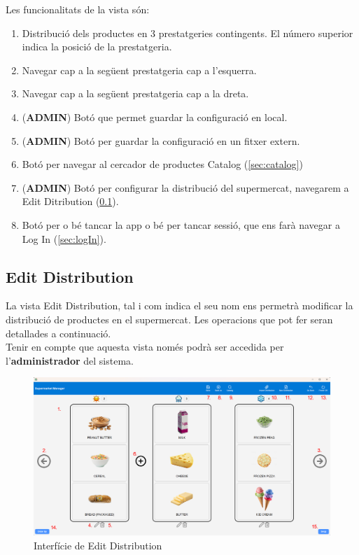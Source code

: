 \documentclass[a4paper,12pt]{article}
\begin{document}
	\noindent Les funcionalitats de la vista són:
	
	\begin{enumerate}[itemsep=0pt, topsep=0pt]
		\item Distribució dels productes en 3 prestatgeries contingents. El número superior indica la posició de la prestatgeria.
		\item Navegar cap a la següent prestatgeria cap a l'esquerra.
		\item Navegar cap a la següent prestatgeria cap a la dreta.
		\item (\textbf{ADMIN}) Botó que permet guardar la configuració en local.
		\item (\textbf{ADMIN}) Botó per guardar la configuració en un fitxer extern.
		\item Botó per navegar al cercador de productes Catalog (\ref{sec:catalog})
		\item (\textbf{ADMIN}) Botó per configurar la distribució del supermercat, navegarem a Edit Ditribution (\ref{sec:editDistribution}).
		\item Botó per o bé tancar la app o bé per tancar sessió, que ens farà navegar a Log In (\ref{sec:logIn}).
	\end{enumerate}
	
	\newpage
	\subsection{Edit Distribution}
	\label{sec:editDistribution}
	
	La vista Edit Distribution, tal i com indica el seu nom ens permetrà modificar la distribució de productes en el supermercat. Les operacions que pot fer seran detallades a continuació. \\
	
	Tenir en compte que aquesta vista només podrà ser accedida per l'\textbf{administrador} del sistema.
	
	\begin{figure}[H] 
		\centering
		\includegraphics[width=0.75\linewidth]{assets/editdistribution.png}
		\caption{Interfície de Edit Distribution}
	\end{figure}
	
\end{document}
